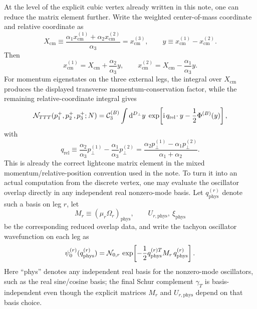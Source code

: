\documentclass[11pt]{article}
\numberwithin{equation}{section}
\newcommand{\perpD}{D_\perp}
\newcommand{\ii}{\mathrm{i}}
\newcommand{\dd}{\mathrm{d}}
\begin{document}
At the level of the explicit cubic vertex already written in this note, one can reduce the matrix element further. Write the weighted center-of-mass coordinate and relative coordinate as
\begin{equation}
\label{eq:s12-1-002}
X_{\mathrm{cm}}
\equiv
\frac{\alpha_1 x_{\mathrm{cm}}^{(1)}+\alpha_2 x_{\mathrm{cm}}^{(2)}}{\alpha_3}
=
x_{\mathrm{cm}}^{(3)},
\qquad
y\equiv x_{\mathrm{cm}}^{(1)}-x_{\mathrm{cm}}^{(2)}.
\end{equation}
Then
\begin{equation}
\label{eq:s12-1-003}
x_{\mathrm{cm}}^{(1)} = X_{\mathrm{cm}}+\frac{\alpha_2}{\alpha_3}y,
\qquad
x_{\mathrm{cm}}^{(2)} = X_{\mathrm{cm}}-\frac{\alpha_1}{\alpha_3}y.
\end{equation}
For momentum eigenstates on the three external legs, the integral over $X_{\mathrm{cm}}$ produces the displayed transverse momentum-conservation factor, while the remaining relative-coordinate integral gives
\begin{equation}
\label{eq:s12-1-004}
{\cal N}_{TTT}(p_1^+,p_2^+,p_3^+;N)
=
{\cal C}_3^{(B)}
\int \dd^{\perpD}y\;
\exp\!\left[
\ii\,q_{\mathrm{rel}}\!\cdot y
-\frac12 \Phi^{(B)}(y)
\right],
\end{equation}
with
\begin{equation}
\label{eq:s12-1-005}
q_{\mathrm{rel}}
\equiv
\frac{\alpha_2}{\alpha_3}p_\perp^{(1)}
-\frac{\alpha_1}{\alpha_3}p_\perp^{(2)}
=
\frac{\alpha_2 p_\perp^{(1)}-\alpha_1 p_\perp^{(2)}}{\alpha_1+\alpha_2}.
\end{equation}
This is already the correct lightcone matrix element in the mixed momentum/relative-position convention used in the note. To turn it into an actual computation from the discrete vertex, one may evaluate the oscillator overlap directly in any independent real nonzero-mode basis. Let $q_{\mathrm{phys}}^{(r)}$ denote such a basis on leg $r$, let
\begin{equation}
\label{eq:s12-1-006}
M_r \equiv (\mu_r\Omega_r)_{\mathrm{phys}},
\qquad
U_{r,\mathrm{phys}},\ \xi_{\mathrm{phys}}
\end{equation}
be the corresponding reduced overlap data, and write the tachyon oscillator wavefunction on each leg as
\begin{equation}
\label{eq:s12-1-007}
\psi_{0}^{(r)}(q_{\mathrm{phys}}^{(r)})
=
{\cal N}_{0,r}\,
\exp\!\left[-\frac12 q_{\mathrm{phys}}^{(r)T} M_r\, q_{\mathrm{phys}}^{(r)}\right].
\end{equation}
Here ``phys'' denotes any independent real basis for the nonzero-mode oscillators, such as the real sine/cosine basis; the final Schur complement $\gamma_T$ is basis-independent even though the explicit matrices $M_r$ and $U_{r,\mathrm{phys}}$ depend on that basis choice.
\end{document}
